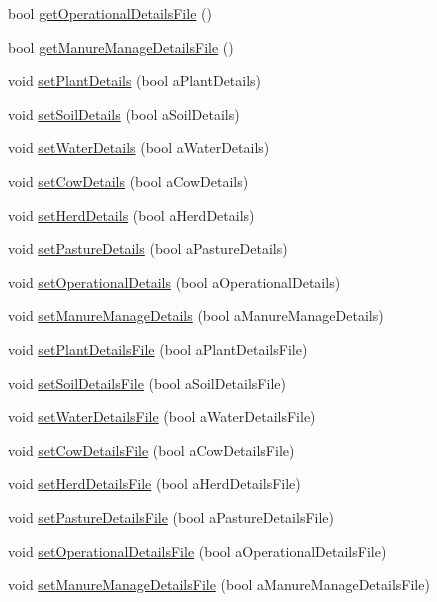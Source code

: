 \begin{DoxyCompactItemize}
\item 
bool \hyperlink{classoutput_details_a80f4fc088c8f6c4b0245a26e17f60423}{getOperationalDetailsFile} ()
\item 
bool \hyperlink{classoutput_details_a7ce747287793f4fe1c3e45e32c5a9213}{getManureManageDetailsFile} ()
\item 
void \hyperlink{classoutput_details_a95d748bfde90ff8289e78258aa53cedf}{setPlantDetails} (bool aPlantDetails)
\item 
void \hyperlink{classoutput_details_a7bfd3d4deeeb9664454f8f823cbf2ac3}{setSoilDetails} (bool aSoilDetails)
\item 
void \hyperlink{classoutput_details_aba60855f94a9b79b921ecdee6375235c}{setWaterDetails} (bool aWaterDetails)
\item 
void \hyperlink{classoutput_details_a25b50be63d4ac8437a617f3b93e805f5}{setCowDetails} (bool aCowDetails)
\item 
void \hyperlink{classoutput_details_a6c941f90992be5aec6e7cbbed93a1a76}{setHerdDetails} (bool aHerdDetails)
\item 
void \hyperlink{classoutput_details_a9f7d2f614fcd1a984c53911c96e8ed58}{setPastureDetails} (bool aPastureDetails)
\item 
void \hyperlink{classoutput_details_af97610b106324348ad8777d270e14aac}{setOperationalDetails} (bool aOperationalDetails)
\item 
void \hyperlink{classoutput_details_a4cca5f0b406b7646f56cedf55cc5c2b9}{setManureManageDetails} (bool aManureManageDetails)
\item 
void \hyperlink{classoutput_details_ae8d2954fa3d710ed6ef777a9ca07cae1}{setPlantDetailsFile} (bool aPlantDetailsFile)
\item 
void \hyperlink{classoutput_details_a4a9ea8a53503ed711798cfd8be13126e}{setSoilDetailsFile} (bool aSoilDetailsFile)
\item 
void \hyperlink{classoutput_details_a366b23cde6eda1cce1549f5ff94f2de8}{setWaterDetailsFile} (bool aWaterDetailsFile)
\item 
void \hyperlink{classoutput_details_ad6829ddb82a9d7a625faf0de1e812881}{setCowDetailsFile} (bool aCowDetailsFile)
\item 
void \hyperlink{classoutput_details_a782777d55f56959aea269c2a3d53f7b0}{setHerdDetailsFile} (bool aHerdDetailsFile)
\item 
void \hyperlink{classoutput_details_a119112566be2fa83fbbb565d24b2833d}{setPastureDetailsFile} (bool aPastureDetailsFile)
\item 
void \hyperlink{classoutput_details_ab3d48ad8246f20cd88a0fc30495d8a41}{setOperationalDetailsFile} (bool aOperationalDetailsFile)
\item 
void \hyperlink{classoutput_details_adfac1701353fcb6e9e1142c23f6c280e}{setManureManageDetailsFile} (bool aManureManageDetailsFile)
\end{DoxyCompactItemize}


